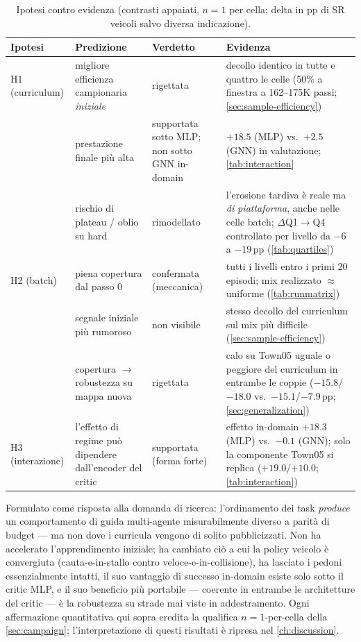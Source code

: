 \begin{table}[t]
  \centering\small
  \caption{Ipotesi contro evidenza (contrasti appaiati, $n{=}1$ per
  cella; delta in pp di SR veicoli salvo diversa indicazione).}
  \label{tab:hypotheses}
  \begin{tabular}{@{}p{2.2cm}p{4.6cm}p{2.2cm}p{4.0cm}@{}}
    \toprule
    Ipotesi & Predizione & Verdetto & Evidenza \\
    \midrule
    H1 (curriculum) & migliore efficienza campionaria \emph{iniziale} & rigettata &
      decollo identico in tutte e quattro le celle (50\% a finestra a
      162--175K passi; \cref{sec:sample-efficiency}) \\
    & prestazione finale più alta & supportata sotto MLP; non sotto GNN
      in-domain &
      $+18.5$ (MLP) vs.\ $+2.5$ (GNN) in valutazione;
      \cref{tab:interaction} \\
    & rischio di plateau / oblio su hard & rimodellato &
      l'erosione tardiva è reale ma \emph{di piattaforma}, anche nelle
      celle batch; $\Delta$Q1$\to$Q4 controllato per livello da $-6$ a
      $-19$\,pp (\cref{tab:quartiles}) \\
    \addlinespace
    H2 (batch) & piena copertura dal passo 0 & confermata (meccanica) &
      tutti i livelli entro i primi 20 episodi; mix realizzato
      $\approx$ uniforme (\cref{tab:runmatrix}) \\
    & segnale iniziale più rumoroso & non visibile &
      stesso decollo del curriculum sul mix più difficile
      (\cref{sec:sample-efficiency}) \\
    & copertura $\to$ robustezza su mappa nuova & rigettata &
      calo su Town05 uguale o peggiore del curriculum in entrambe le
      coppie ($-15.8$/$-18.0$ vs.\ $-15.1$/$-7.9$\,pp;
      \cref{sec:generalization}) \\
    \addlinespace
    H3 (interazione) & l'effetto di regime può dipendere dall'encoder
      del critic &
      supportata (forma forte) &
      effetto in-domain $+18.3$ (MLP) vs.\ $-0.1$ (GNN); solo la
      componente Town05 si replica ($+19.0$/$+10.0$;
      \cref{tab:interaction}) \\
    \bottomrule
  \end{tabular}
\end{table}

Formulato come risposta alla domanda di ricerca: l'ordinamento dei task
\emph{produce} un comportamento di guida multi-agente misurabilmente
diverso a parità di budget --- ma non dove i curricula vengono di
solito pubblicizzati. Non ha accelerato l'apprendimento iniziale; ha
cambiato ciò a cui la policy veicolo è convergiuta (cauta-e-in-stallo
contro veloce-e-in-collisione), ha lasciato i pedoni essenzialmente
intatti, il suo vantaggio di successo in-domain esiste solo sotto il
critic MLP, e il suo beneficio più portabile --- coerente in entrambe
le architetture del critic --- è la robustezza su strade mai viste in
addestramento. Ogni affermazione quantitativa qui sopra eredita la
qualifica $n{=}1$-per-cella della \cref{sec:campaign};
l'interpretazione di questi risultati è ripresa nel
\cref{ch:discussion}.
